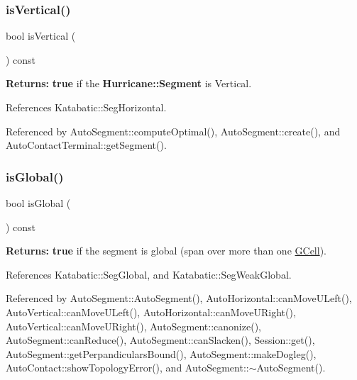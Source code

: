 \subsubsection{\texorpdfstring{is\+Vertical()}{isVertical()}}
{\footnotesize\ttfamily bool is\+Vertical (\begin{DoxyParamCaption}{ }\end{DoxyParamCaption}) const\hspace{0.3cm}{\ttfamily [inline]}}

{\bfseries Returns\+:} {\bfseries true} if the \textbf{ Hurricane\+::\+Segment} is Vertical. 

References Katabatic\+::\+Seg\+Horizontal.



Referenced by Auto\+Segment\+::compute\+Optimal(), Auto\+Segment\+::create(), and Auto\+Contact\+Terminal\+::get\+Segment().

\mbox{\label{classKatabatic_1_1AutoSegment_a19ba379112d6b29faa45c5eefbf38500}} 
\subsubsection{\texorpdfstring{is\+Global()}{isGlobal()}}
{\footnotesize\ttfamily bool is\+Global (\begin{DoxyParamCaption}{ }\end{DoxyParamCaption}) const\hspace{0.3cm}{\ttfamily [inline]}}

{\bfseries Returns\+:} {\bfseries true} if the segment is global (span over more than one \hyperlink{classKatabatic_1_1GCell}{G\+Cell}). 

References Katabatic\+::\+Seg\+Global, and Katabatic\+::\+Seg\+Weak\+Global.



Referenced by Auto\+Segment\+::\+Auto\+Segment(), Auto\+Horizontal\+::can\+Move\+U\+Left(), Auto\+Vertical\+::can\+Move\+U\+Left(), Auto\+Horizontal\+::can\+Move\+U\+Right(), Auto\+Vertical\+::can\+Move\+U\+Right(), Auto\+Segment\+::canonize(), Auto\+Segment\+::can\+Reduce(), Auto\+Segment\+::can\+Slacken(), Session\+::get(), Auto\+Segment\+::get\+Perpandiculars\+Bound(), Auto\+Segment\+::make\+Dogleg(), Auto\+Contact\+::show\+Topology\+Error(), and Auto\+Segment\+::$\sim$\+Auto\+Segment().

